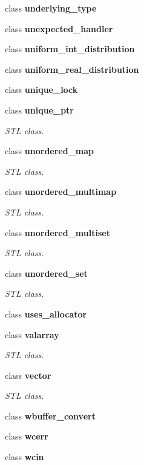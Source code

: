 \begin{DoxyCompactItemize}
class \textbf{ underlying\+\_\+type}
\item 
class \textbf{ unexpected\+\_\+handler}
\item 
class \textbf{ uniform\+\_\+int\+\_\+distribution}
\item 
class \textbf{ uniform\+\_\+real\+\_\+distribution}
\item 
class \textbf{ unique\+\_\+lock}
\item 
class \textbf{ unique\+\_\+ptr}
\begin{DoxyCompactList}\small\item\em S\+TL class. \end{DoxyCompactList}\item 
class \textbf{ unordered\+\_\+map}
\begin{DoxyCompactList}\small\item\em S\+TL class. \end{DoxyCompactList}\item 
class \textbf{ unordered\+\_\+multimap}
\begin{DoxyCompactList}\small\item\em S\+TL class. \end{DoxyCompactList}\item 
class \textbf{ unordered\+\_\+multiset}
\begin{DoxyCompactList}\small\item\em S\+TL class. \end{DoxyCompactList}\item 
class \textbf{ unordered\+\_\+set}
\begin{DoxyCompactList}\small\item\em S\+TL class. \end{DoxyCompactList}\item 
class \textbf{ uses\+\_\+allocator}
\item 
class \textbf{ valarray}
\begin{DoxyCompactList}\small\item\em S\+TL class. \end{DoxyCompactList}\item 
class \textbf{ vector}
\begin{DoxyCompactList}\small\item\em S\+TL class. \end{DoxyCompactList}\item 
class \textbf{ wbuffer\+\_\+convert}
\item 
class \textbf{ wcerr}
\item 
class \textbf{ wcin}

\end{DoxyCompactItemize}
